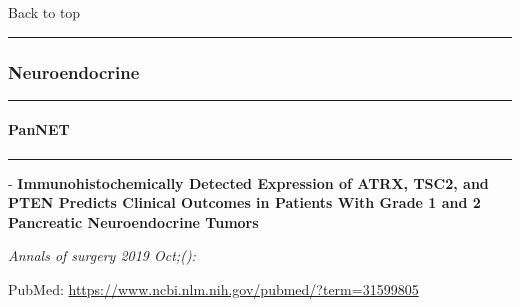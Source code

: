 \documentclass[
]{article}
\renewcommand{\linethickness}{0.05em}
\begin{document}
Back to top

\begin{center}\rule{0.5\linewidth}{\linethickness}\end{center}

\pagebreak

\hypertarget{net}{%
\subsubsection{Neuroendocrine}\label{net}}

\begin{center}\rule{0.5\linewidth}{\linethickness}\end{center}

\hypertarget{net_morphology}{%
\paragraph{PanNET}\label{net_morphology}}

\begin{center}\rule{0.5\linewidth}{\linethickness}\end{center}

- \textbf{Immunohistochemically Detected Expression of ATRX, TSC2, and
PTEN Predicts Clinical Outcomes in Patients With Grade 1 and 2
Pancreatic Neuroendocrine Tumors}

\emph{Annals of surgery 2019 Oct;():}

PubMed: \url{https://www.ncbi.nlm.nih.gov/pubmed/?term=31599805}
\end{document}
